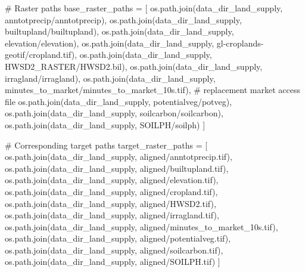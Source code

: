 \documentclass[
  letterpaper,
]{article}
\newenvironment{Shaded}{\begin{snugshade}}{\end{snugshade}}
\newcommand{\CommentTok}[1]{\textcolor[rgb]{0.37,0.37,0.37}{#1}}
\newcommand{\NormalTok}[1]{\textcolor[rgb]{0.00,0.23,0.31}{#1}}
\newcommand{\OperatorTok}[1]{\textcolor[rgb]{0.37,0.37,0.37}{#1}}
\newcommand{\StringTok}[1]{\textcolor[rgb]{0.13,0.47,0.30}{#1}}
\begin{document}
\begin{Shaded}
\begin{Highlighting}[]
\CommentTok{\# Raster paths}
\NormalTok{base\_raster\_paths }\OperatorTok{=}\NormalTok{ [}
\NormalTok{    os.path.join(data\_dir\_land\_supply, }\StringTok{\textquotesingle{}anntotprecip/anntotprecip\textquotesingle{}}\NormalTok{),}
\NormalTok{    os.path.join(data\_dir\_land\_supply, }\StringTok{\textquotesingle{}builtupland/builtupland\textquotesingle{}}\NormalTok{),}
\NormalTok{    os.path.join(data\_dir\_land\_supply, }\StringTok{\textquotesingle{}elevation/elevation\textquotesingle{}}\NormalTok{),}
\NormalTok{    os.path.join(data\_dir\_land\_supply, }\StringTok{\textquotesingle{}gl{-}croplands{-}geotif/cropland.tif\textquotesingle{}}\NormalTok{),}
\NormalTok{    os.path.join(data\_dir\_land\_supply, }\StringTok{\textquotesingle{}HWSD2\_RASTER/HWSD2.bil\textquotesingle{}}\NormalTok{),}
\NormalTok{    os.path.join(data\_dir\_land\_supply, }\StringTok{\textquotesingle{}irragland/irragland\textquotesingle{}}\NormalTok{),}
\NormalTok{    os.path.join(data\_dir\_land\_supply, }\StringTok{\textquotesingle{}minutes\_to\_market/minutes\_to\_market\_10s.tif\textquotesingle{}}\NormalTok{), }\CommentTok{\# replacement market access file}
\NormalTok{    os.path.join(data\_dir\_land\_supply, }\StringTok{\textquotesingle{}potentialveg/potveg\textquotesingle{}}\NormalTok{),}
\NormalTok{    os.path.join(data\_dir\_land\_supply, }\StringTok{\textquotesingle{}soilcarbon/soilcarbon\textquotesingle{}}\NormalTok{),}
\NormalTok{    os.path.join(data\_dir\_land\_supply, }\StringTok{\textquotesingle{}SOILPH/soilph\textquotesingle{}}\NormalTok{)}
\NormalTok{]}

\CommentTok{\# Corresponding target paths}
\NormalTok{target\_raster\_paths }\OperatorTok{=}\NormalTok{ [}
\NormalTok{    os.path.join(data\_dir\_land\_supply, }\StringTok{\textquotesingle{}aligned/anntotprecip.tif\textquotesingle{}}\NormalTok{),}
\NormalTok{    os.path.join(data\_dir\_land\_supply, }\StringTok{\textquotesingle{}aligned/builtupland.tif\textquotesingle{}}\NormalTok{),}
\NormalTok{    os.path.join(data\_dir\_land\_supply, }\StringTok{\textquotesingle{}aligned/elevation.tif\textquotesingle{}}\NormalTok{),}
\NormalTok{    os.path.join(data\_dir\_land\_supply, }\StringTok{\textquotesingle{}aligned/cropland.tif\textquotesingle{}}\NormalTok{),}
\NormalTok{    os.path.join(data\_dir\_land\_supply, }\StringTok{\textquotesingle{}aligned/HWSD2.tif\textquotesingle{}}\NormalTok{),}
\NormalTok{    os.path.join(data\_dir\_land\_supply, }\StringTok{\textquotesingle{}aligned/irragland.tif\textquotesingle{}}\NormalTok{),}
\NormalTok{    os.path.join(data\_dir\_land\_supply, }\StringTok{\textquotesingle{}aligned/minutes\_to\_market\_10s.tif\textquotesingle{}}\NormalTok{),}
\NormalTok{    os.path.join(data\_dir\_land\_supply, }\StringTok{\textquotesingle{}aligned/potentialveg.tif\textquotesingle{}}\NormalTok{),}
\NormalTok{    os.path.join(data\_dir\_land\_supply, }\StringTok{\textquotesingle{}aligned/soilcarbon.tif\textquotesingle{}}\NormalTok{),}
\NormalTok{    os.path.join(data\_dir\_land\_supply, }\StringTok{\textquotesingle{}aligned/SOILPH.tif\textquotesingle{}}\NormalTok{)}
\NormalTok{]}


\end{Highlighting}
\end{Shaded}
\end{document}
